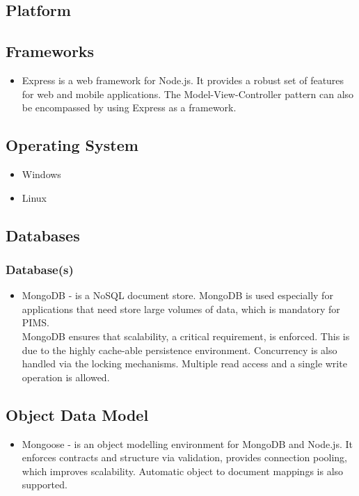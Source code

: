 \subsection{Platform}
\begin{itemize}
\end{itemize}


\subsection{Frameworks}
\begin{itemize}
		\item Express is a web framework for Node.js. It provides a robust set of features for web and mobile applications. The Model-View-Controller pattern can also be encompassed by using Express as a framework. 
\end{itemize}

\subsection{Operating System}
\begin{itemize}
		\item Windows
		\item Linux
\end{itemize}
	
	
\subsection{Databases}
\subsubsection{Database(s)}
\begin{itemize}
	\item MongoDB - is a NoSQL document store. MongoDB is used especially for applications that need store large volumes of data, which is mandatory for PIMS. \\
	MongoDB ensures that scalability, a critical requirement, is enforced. This is due to the highly cache-able persistence environment. Concurrency is also handled  via the locking mechanisms. Multiple read access and a single write operation is allowed.
\end{itemize}
	

\subsection{Object Data Model}
\begin{itemize}
	\item Mongoose - is an object modelling environment for MongoDB and Node.js. It enforces contracts and structure via validation, provides connection pooling, which improves scalability. Automatic object to document mappings is also supported.
\end{itemize}

